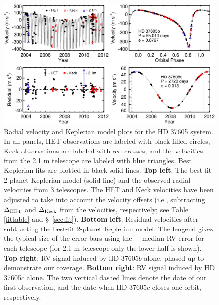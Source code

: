\clearpage
\begin{figure}
\includegraphics[scale=0.55]{37605/f1.eps}
\caption{Radial velocity and Keplerian model plots for the HD 37605
  system. In all panels, HET observations are labeled with black
  filled circles, Keck observations are labeled with red crosses, and
  the velocities from the 2.1 m telescope \citep{cochran2004} are
  labeled with blue triangles. Best Keplerian fits are plotted in
  black solid lines.
%
  {\bf Top left}: The best-fit 2-planet Keplerian model (solid
  line) and the observed radial velocities from 3 telescopes. The HET
  and Keck velocities have been adjusted to take into account the
  velocity offsets (i.e., subtracting $\Delta_{\rm HET}$ and
  $\Delta_{\rm Keck}$ from the velocities, respectively; see Table
  \ref{fittable} and \S~\ref{sec:fit}).
% 
  {\bf Bottom left}: Residual velocities after subtracting the
  best-fit 2-planet Keplerian model. The lengend gives the typical
  size of the error bars using the $\pm$ median RV error for each
  telescope (for 2.1 m telescope only the lower half is shown).
%  
  {\bf Top right}: RV signal induced by HD 37605$b$ alone, phased up
  to demonstrate our coverage. 
%
  {\bf Bottom right}: RV signal induced by HD 37605$c$ alone. The two
  vertical dashed lines denote the date of our first observation, and
  the date when HD 37605$c$ closes one orbit, respectively. \label{rvplot}}
\end{figure}




